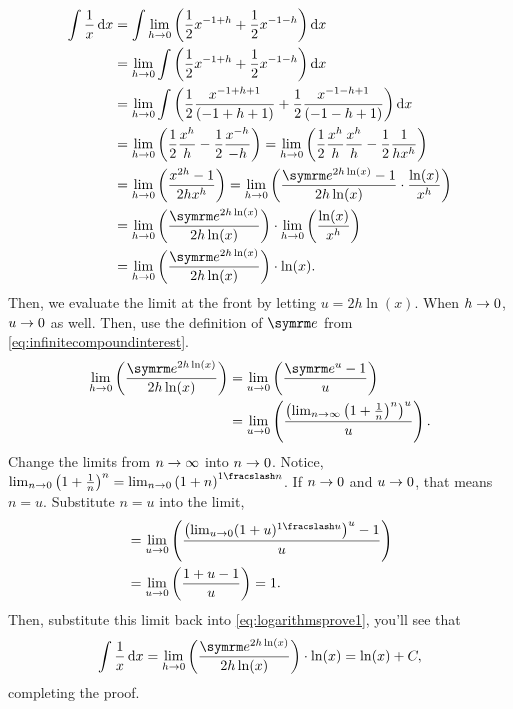 \begin{align}
	\int \frac{1}{x}\odif{x} &= \int\lim_{h \appr 0}\left(\frac{1}{2}x^{-1 + h} + \frac{1}{2}x^{-1 - h}\right)\odif{x} \nonumber\\
							 &= \lim_{h \appr 0}\int\left(\frac{1}{2}x^{-1 + h} + \frac{1}{2}x^{-1 - h}\right)\odif{x} \nonumber\\
							 &= \lim_{h \appr 0}\int\left(\frac{1}{2}\frac{x^{-1 + h + 1}}{(-1 + h + 1)} + \frac{1}{2}\frac{x^{-1 - h + 1}}{(-1 - h + 1)}\right)\odif{x} \nonumber\\
    &= \lim_{h \appr 0}\left(\frac{1}{2}\frac{x^h}{h} - \frac{1}{2}\frac{x^{-h}}{-h}\right) = \lim_{h \appr 0}\left(\frac{1}{2}\frac{x^h}{h}\frac{x^h}{h} - \frac{1}{2}\frac{1}{hx^h}\right) \nonumber\\
    &= \lim_{h \appr 0}\left(\frac{x^{2h} - 1}{2hx^h}\right) = \lim_{h \appr 0}\left(\frac{\e^{2h\ln(x)} - 1}{2h\ln(x)}\cdot\frac{\ln(x)}{x^h}\right) \nonumber\\
    &= \lim_{h \appr 0}\left(\frac{\e^{2h\ln(x)}}{2h\ln(x)}\right) \cdot \lim_{h \appr 0}\left(\frac{\ln(x)}{x^h}\right) \nonumber\\
    &= \lim_{h \appr 0}\left(\frac{\e^{2h\ln(x)}}{2h\ln(x)}\right) \cdot \ln(x). \label{eq:logarithmsprove1}
\end{align}
Then, we evaluate the limit at the front by letting $u = 2h\ln(x)$. When $h \rightarrow 0$, $u \rightarrow 0$ as well. Then, use the definition of $\e$ from \cref{eq:infinitecompoundinterest}.
\begin{align*}
    \lim_{h \appr 0}\left(\frac{\e^{2h\ln(x)}}{2h\ln(x)}\right) &= \lim_{u \appr 0}\left(\frac{\e^u - 1}{u}\right) \\
    &= \lim_{u \appr 0}\left(\frac{\left(\lim_{n \appr \infty}\left(1 + \frac{1}{n}\right)^n\right)^u}{u}\right).
\end{align*}
Change the limits from $n \rightarrow \infty$ into $n \rightarrow 0$. Notice, $\lim_{n \appr 0}\left(1 + \frac{1}{n}\right)^n = \lim_{n \appr 0}\left(1 + n\right)^{\flatfrac{1}{n}}$. If $n \rightarrow 0$ and $u \rightarrow 0$, that means $n = u$. Substitute $n = u$ into the limit,
\begin{align*}
    &= \lim_{u \appr 0}\left(\frac{\left(\lim_{u \appr 0}(1 + u)^{\flatfrac{1}{u}}\right)^u - 1}{u}\right) \\
    &= \lim_{u \appr 0}\left(\frac{1 + u - 1}{u}\right) = 1.
\end{align*}
Then, substitute this limit back into \cref{eq:logarithmsprove1}, you'll see that
\begin{equation*}
    \int\frac{1}{x}\odif{x} = \lim_{h \appr 0}\left(\frac{\e^{2h\ln(x)}}{2h\ln(x)}\right) \cdot \ln(x) = \ln(x) + C,
\end{equation*}
completing the proof.

